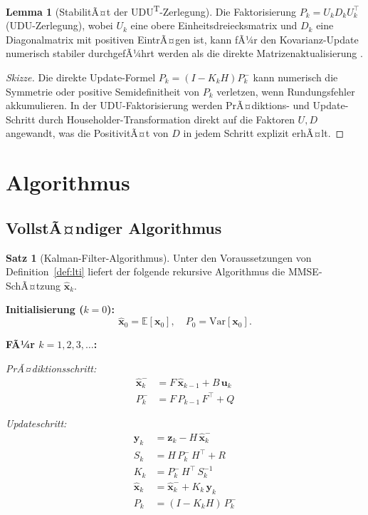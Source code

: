 ﻿\documentclass[a4paper,12pt]{article}
\theoremstyle{definition}
\newtheorem{satz}{Satz}
\newtheorem{lemma}{Lemma}
\begin{document}
\begin{lemma}[StabilitÃ¤t der UDU\textsuperscript{T}-Zerlegung]
    Die Faktorisierung $P_k = U_k D_k U_k^\top$ (UDU-Zerlegung), wobei $U_k$ eine
    obere Einheitsdreiecksmatrix und $D_k$ eine Diagonalmatrix mit positiven EintrÃ¤gen ist,
    kann fÃ¼r den Kovarianz-Update numerisch stabiler durchgefÃ¼hrt werden als die direkte
    Matrizenaktualisierung \cite{bierman1977}.
\end{lemma}

\begin{proof}[Skizze]
Die direkte Update-Formel $P_k = (I - K_k H) P_k^-$ kann numerisch die
Symmetrie oder positive Semidefinitheit von $P_k$ verletzen, wenn Rundungsfehler
akkumulieren. In der UDU-Faktorisierung werden PrÃ¤diktions- und Update-Schritt
durch Householder-Transformation direkt auf die Faktoren $U, D$ angewandt,
was die PositivitÃ¤t von $D$ in jedem Schritt explizit erhÃ¤lt.
\end{proof}

\section{Algorithmus}

\subsection{VollstÃ¤ndiger Algorithmus}

\begin{satz}[Kalman-Filter-Algorithmus]
    Unter den Voraussetzungen von Definition~\ref{def:lti} liefert der folgende
    rekursive Algorithmus die MMSE-SchÃ¤tzung $\hat{\mathbf{x}}_k$.
\end{satz}

\textbf{Initialisierung ($k=0$):}
\[
    \hat{\mathbf{x}}_0 = \mathbb{E}[\mathbf{x}_0], \quad P_0 = \mathrm{Var}[\mathbf{x}_0].
\]

\textbf{FÃ¼r $k = 1, 2, 3, \ldots$:}

\emph{PrÃ¤diktionsschritt:}
\begin{align*}
    \hat{\mathbf{x}}_k^- &= F\,\hat{\mathbf{x}}_{k-1} + B\,\mathbf{u}_k \\
    P_k^-               &= F\,P_{k-1}\,F^\top + Q
\end{align*}

\emph{Updateschritt:}
\begin{align*}
    \mathbf{y}_k        &= \mathbf{z}_k - H\,\hat{\mathbf{x}}_k^- \\
    S_k                 &= H\,P_k^-\,H^\top + R \\
    K_k                 &= P_k^-\,H^\top\,S_k^{-1} \\
    \hat{\mathbf{x}}_k  &= \hat{\mathbf{x}}_k^- + K_k\,\mathbf{y}_k \\
    P_k                 &= (I - K_k H)\,P_k^-
\end{align*}
\end{document}
